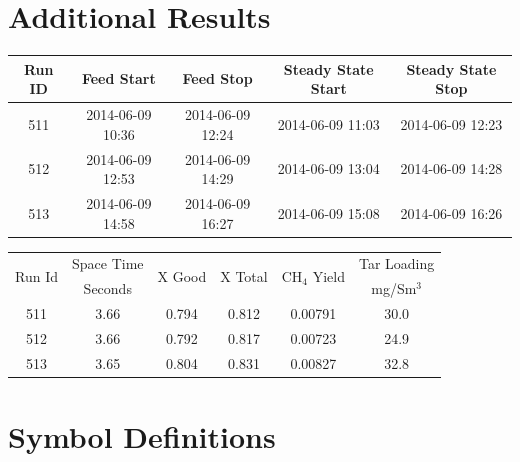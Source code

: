 \documentclass[11pt,twocolumn]{article}
\begin{document}
\section{Additional Results}

\begin{center}

\begin{tabular}{ccccc}
	\toprule
	Run ID &            Feed Start &             Feed Stop &            Steady State Start &             Steady State Stop \\
	\midrule
	511    & 2014-06-09 10:36 & 2014-06-09 12:24 & 2014-06-09 11:03 & 2014-06-09 12:23 \\
	512    & 2014-06-09 12:53 & 2014-06-09 14:29 & 2014-06-09 13:04 & 2014-06-09 14:28 \\
	513    & 2014-06-09 14:58 & 2014-06-09 16:27 & 2014-06-09 15:08 & 2014-06-09 16:26 \\
	\bottomrule
\end{tabular}

\vspace{5 mm}

\begin{tabular}{c c c c c c}
	\toprule
	\multirow{2}{*}{Run Id} &  Space Time &  \multirow{2}{*}{X Good} &  \multirow{2}{*}{X Total} &  \multirow{2}{*}{CH$_4$ Yield} &  Tar Loading \\
	{}						& Seconds		& {}						& {}							& {}						& mg/Sm$^3$ \\			
	\midrule
	511    &         3.66 &    0.794 &   0.812 &       0.00791 &          30.0 \\
	512    &         3.66 &    0.792 &   0.817 &       0.00723 &          24.9 \\
	513    &         3.65 &    0.804 &   0.831 &       0.00827 &          32.8 \\
	\bottomrule
\end{tabular}
\end{center}


\section{Symbol Definitions}
\label{ap_symbols}
\end{document}
